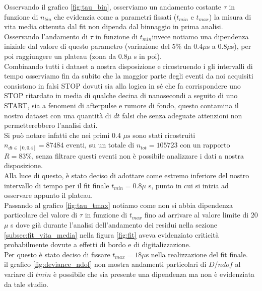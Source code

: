 \documentclass[10pt,a4paper]{article}
\begin{document}
\begin{flushleft}
Osservando il grafico \ref{fig:tau_bin}, osserviamo un andamento costante $\tau$ in funzione di $n_{bin}$ che evidenzia come a parametri fissati ($t_{min}$ e $t_{max}$) la misura di vita media ottenuta dal fit non dipenda dal binnaggio in prima analisi.\\
Osservando l'andamento di $\tau$ in funzione di $t_{min}$invece notiamo una dipendenza iniziale dal valore di questo parametro (variazione del 5\% da $0.4\mu$s a $0.8\mu$s), per poi raggiungere un plateau (zona da 0.8$\mu$ s in poi).\\
Combinando tutti i dataset a nostra disposizione e ricostruendo i gli intervalli di tempo osserviamo fin da subito che la maggior parte degli eventi da noi acquisiti consistono in falsi STOP dovuti sia alla logica in sé che fa corrispondere uno STOP ritardato in media di qualche decina di nanosecondi a seguito di uno START, sia a fenomeni di afterpulse e rumore di fondo, questo contamina il nostro dataset con una quantità di $dt$ falsi che senza adeguate attenzioni non permetterebbero l'analisi dati.\\
Si può notare infatti che nei primi 0.4 $\mu \text{s}$ sono stati ricostruiti $n_{dt\in[0,0.4]}= 87484 \text{ eventi} $, su un totale di $n_{tot}= 105723$ con un rapporto $R=83\%$, senza filtrare questi eventi non è possibile analizzare i dati a nostra disposizione.\\ 
Alla luce di questo, è stato deciso di adottare come estremo inferiore del nostro intervallo di tempo per il fit finale $t_{min}=0.8\mu$ s, punto in cui si inizia ad osservare appunto il plateau.\\
Passando al grafico \ref{fig:tau_tmax} notiamo come non si abbia dipendenza particolare del valore di $\tau$ in funzione di $t_{max}$ fino ad arrivare al valore limite di 20$\mu$ s dove già durante l'analisi dell'andamento dei residui nella sezione \ref{subsec:fit_vita_media} nella figura \ref{fig:fit} aveva evidenziato criticità probabilmente dovute a effetti di bordo e di digitalizzazione.\\
Per questo è stato deciso di fissare $t_{max}=18 \mu $s nella realizzazione del fit finale.\\
il grafico \ref{fig:deviance_ndof} non mostra andamenti particolari di $D/ndof$ al variare di $t{min}$ è possibile che sia presente una dipendenza ma non è evidenziata da tale studio.\\
\end{flushleft}
\end{document}
